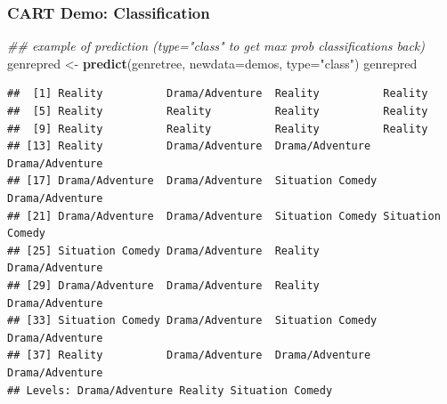 \documentclass[
  shownotes,
  xcolor={svgnames},
  hyperref={colorlinks,citecolor=DarkBlue,linkcolor=DarkRed,urlcolor=DarkBlue}
  , aspectratio=169]{beamer}
\newenvironment{Shaded}{\begin{snugshade}}{\end{snugshade}}
\newcommand{\CommentTok}[1]{\textcolor[rgb]{0.56,0.35,0.01}{\textit{#1}}}
\newcommand{\DataTypeTok}[1]{\textcolor[rgb]{0.13,0.29,0.53}{#1}}
\newcommand{\KeywordTok}[1]{\textcolor[rgb]{0.13,0.29,0.53}{\textbf{#1}}}
\newcommand{\NormalTok}[1]{#1}
\newcommand{\StringTok}[1]{\textcolor[rgb]{0.31,0.60,0.02}{#1}}
\begin{document}
\begin{frame}[fragile]
\frametitle{CART Demo: Classification}

\begin{scriptsize}
\begin{Shaded}
\begin{Highlighting}[]
\CommentTok{\#\# example of prediction (type="class"  to get max prob classifications back)}
\NormalTok{genrepred \textless{}{-}}\StringTok{ }\KeywordTok{predict}\NormalTok{(genretree, }\DataTypeTok{newdata=}\NormalTok{demos, }\DataTypeTok{type=}\StringTok{"class"}\NormalTok{)}
\NormalTok{genrepred}
\end{Highlighting}
\end{Shaded}
\end{scriptsize}

\begin{tiny}
\begin{verbatim}
##  [1] Reality          Drama/Adventure  Reality          Reality         
##  [5] Reality          Reality          Reality          Reality         
##  [9] Reality          Reality          Reality          Reality         
## [13] Reality          Drama/Adventure  Drama/Adventure  Drama/Adventure 
## [17] Drama/Adventure  Drama/Adventure  Situation Comedy Drama/Adventure 
## [21] Drama/Adventure  Drama/Adventure  Situation Comedy Situation Comedy
## [25] Situation Comedy Drama/Adventure  Reality          Drama/Adventure 
## [29] Drama/Adventure  Drama/Adventure  Reality          Drama/Adventure 
## [33] Situation Comedy Drama/Adventure  Situation Comedy Drama/Adventure 
## [37] Reality          Drama/Adventure  Drama/Adventure  Drama/Adventure 
## Levels: Drama/Adventure Reality Situation Comedy
\end{verbatim}
\end{tiny}



\end{frame}

\end{document}
